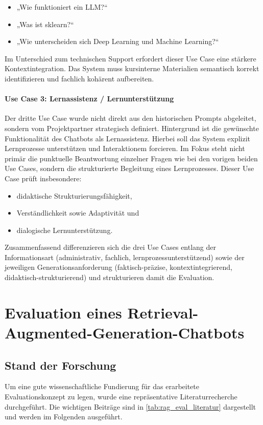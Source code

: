 \begin{itemize}
    \item „Wie funktioniert ein LLM?“
    \item „Was ist sklearn?“
    \item „Wie unterscheiden sich Deep Learning und Machine Learning?“
\end{itemize}
Im Unterschied zum technischen Support erfordert dieser Use Case eine stärkere Kontextintegration. Das System muss kursinterne Materialien semantisch korrekt identifizieren und fachlich kohärent aufbereiten.

\paragraph{Use Case 3: Lernassistenz / Lernunterstützung}

Der dritte Use Case wurde nicht direkt aus den historischen Prompts abgeleitet, sondern vom Projektpartner strategisch definiert. Hintergrund ist die gewünschte Funktionalität des Chatbots als Lernassistenz. Hierbei soll das System explizit Lernprozesse unterstützen und Interaktionem forcieren. Im Fokus steht nicht primär die punktuelle Beantwortung einzelner Fragen wie bei den vorigen beiden Use Cases, sondern die strukturierte Begleitung eines Lernprozesses. Dieser Use Case prüft insbesondere:
\begin{itemize}
    \item didaktische Strukturierungsfähigkeit,
    \item Verständlichkeit sowie Adaptivität und
    \item dialogische Lernunterstützung.
\end{itemize}
Zusammenfassend differenzieren sich die drei Use Cases entlang der Informationsart (administrativ, fachlich, lernprozessunterstützend) sowie der jeweiligen Generationsanforderung (faktisch-präzise, kontextintegrierend, didaktisch-strukturierend) und strukturieren damit die Evaluation.

\section{Evaluation eines Retrieval-Augmented-Generation-Chatbots}

\subsection{Stand der Forschung}
\label{sec:lit_eval}
Um eine gute wissenschaftliche Fundierung für das erarbeitete Evaluationskonzept zu legen, wurde eine repräsentative Literaturrecherche durchgeführt. Die wichtigen Beiträge sind in \autoref{tab:rag_eval_literatur} dargestellt und werden im Folgenden ausgeführt.

